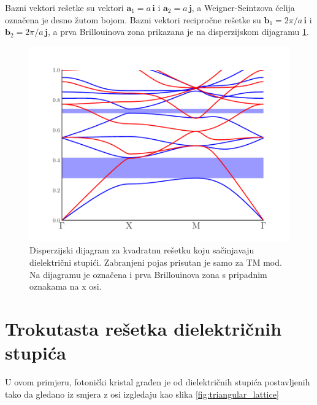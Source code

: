 \documentclass[utf8, seminar, numeric]{fer}
\begin{document}
Bazni vektori rešetke su vektori ${\mathbf{a}_1 = a \, \mathbf{i}}$ i
${\mathbf{a}_2= a \, \mathbf{j}}$, a Weigner-Seintzova ćelija označena je
desno žutom bojom. Bazni vektori recipročne rešetke su
${\mathbf{b}_1 = 2 \pi/a \, \mathbf{i}}$ i
${\mathbf{b}_2 = 2 \pi/a \, \mathbf{j}}$, a prva Brillouinova zona prikazana
je na disperzijskom dijagramu \ref{fig:square_band_diagram}.

\begin{figure}[ht]
	\centering
	\includegraphics[width = 0.8\linewidth]{./images/pdf/square_lattice_rods_band_diagram.pdf}
	\caption{Disperzijski dijagram za kvadratnu rešetku koju sačinjavaju
	dielektrični stupići. Zabranjeni pojas prisutan je samo za TM mod. Na
	dijagramu je označena i prva Brillouinova zona s pripadnim oznakama na x osi.}
	\label{fig:square_band_diagram}
\end{figure}

\FloatBarrier

\section{Trokutasta rešetka dielektričnih stupića} \label{sec:triangle}

U ovom primjeru, fotonički kristal građen je od dielektričnih stupića
postavljenih tako da gledano iz smjera z osi izgledaju kao
slika \ref{fig:triangular_lattice}
\end{document}
